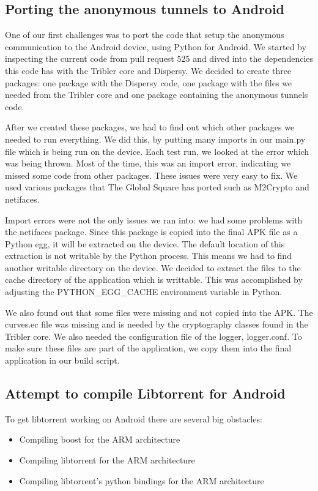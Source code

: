 	\subsection{Porting the anonymous tunnels to Android}
		One of our first challenges was to port the code that setup the anonymous communication to the Android device, using Python for Android. We started by inspecting the current code from pull request 525 and dived into the dependencies this code has with the Tribler core and Dispersy. We decided to create three packages: one package with the Dispersy code, one package with the files we needed from the Tribler core and one package containing the anonymous tunnels code.
		
		After we created these packages, we had to find out which other packages we needed to run everything. We did this, by putting many imports in our main.py file which is being run on the device. Each test run, we looked at the error which was being thrown. Most of the time, this was an import error, indicating we missed some code from other packages. These issues were very easy to fix. We used various packages that The Global Square has ported such as M2Crypto and netifaces.
		
		Import errors were not the only issues we ran into: we had some problems with the netifaces package. Since this package is copied into the final APK file as a Python egg, it will be extracted on the device. The default location of this extraction is not writable by the Python process. This means we had to find another writable directory on the device. We decided to extract the files to the cache directory of the application which is writtable. This was accomplished by adjusting the PYTHON\_EGG\_CACHE environment variable in Python.
		
		We also found out that some files were missing and not copied into the APK. The curves.ec file was missing and is needed by the cryptography classes found in the Tribler core. We also needed the configuration file of the logger, logger.conf. To make sure these files are part of the application, we copy them into the final application in our build script.
		
	\subsection{Attempt to compile Libtorrent for Android}
		To get libtorrent working on Android there are several big obstacles:
		\begin{itemize}
			\item Compiling boost for the ARM architecture
			\item Compiling libtorrent for the ARM architecture
			\item Compiling libtorrent's python bindings for the ARM architecture
		\end{itemize}
		
